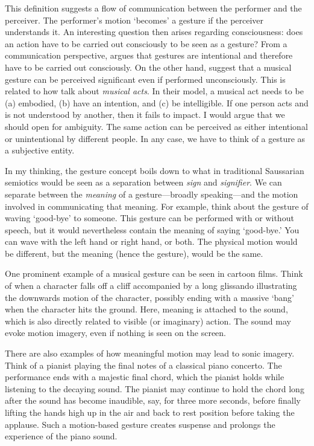 This definition suggests a flow of communication between the performer and the perceiver. The performer's motion `becomes' a gesture if the perceiver understands it. An interesting question then arises regarding consciousness: does an action have to be carried out consciously to be seen as a gesture? From a communication perspective, \citet[p.15]{kendon_gesture_2004} argues that gestures are intentional and therefore have to be carried out consciously. On the other hand, \citet[162]{gritten_music_2006} suggest that a musical gesture can be perceived significant even if performed unconsciously.
This is related to how \citet{murray-rust_towards_2011} talk about \emph{musical acts}. In their model, a musical act needs to be (a) embodied, (b) have an intention, and (c) be intelligible. If one person acts and is not understood by another, then it fails to impact.
I would argue that we should open for ambiguity. The same action can be perceived as either intentional or unintentional by different people. In any case, we have to think of a gesture as a subjective entity.

In my thinking, the gesture concept boils down to what in traditional Saussarian semiotics would be seen as a separation between \emph{sign} and \emph{signifier}. We can separate between the \emph{meaning} of a gesture---broadly speaking---and the motion involved in communicating that meaning. For example, think about the gesture of waving `good-bye' to someone. This gesture can be performed with or without speech, but it would nevertheless contain the meaning of saying `good-bye.' You can wave with the left hand or right hand, or both. The physical motion would be different, but the meaning (hence the gesture), would be the same.

One prominent example of a musical gesture can be seen in cartoon films. Think of when a character falls off a cliff accompanied by a long glissando illustrating the downwards motion of the character, possibly ending with a massive `bang' when the character hits the ground. Here, meaning is attached to the sound, which is also directly related to visible (or imaginary) action. The sound may evoke motion imagery, even if nothing is seen on the screen.

There are also examples of how meaningful motion may lead to sonic imagery. Think of a pianist playing the final notes of a classical piano concerto. The performance ends with a majestic final chord, which the pianist holds while listening to the decaying sound. The pianist may continue to hold the chord long after the sound has become inaudible, say, for three more seconds, before finally lifting the hands high up in the air and back to rest position before taking the applause. Such a motion-based gesture creates suspense and prolongs the experience of the piano sound.

